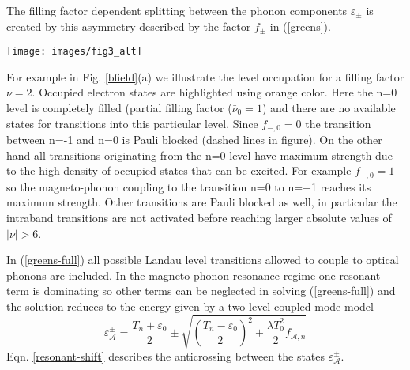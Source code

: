 \documentclass[prl,aps,superscriptaddress,showpacs,reprint]{revtex4-1}
\begin{document}
The filling factor dependent splitting between the phonon components $\varepsilon_{\pm}$ is created by this asymmetry described by the factor $f_{\pm}$ in (\ref{greens}).
\begin{figure*}
   \texttt{[image: images/fig3\_alt]}
   \caption{\label{bfield} a)Schematic view of the Landau level spectrum at B=12.6T, filling factor $\nu=2$ and the lowest Landau level transitions participating in magneto-phonon coupling. Filled electronic states are highlighted using orange color. Red and blue arrows show transitions allowed by the selection rule $\Delta\left|n\right|= \pm 1$. Dashed arrows mark Pauli blocked transitions. Circular arrows represent the angular momentum involved in the transitions b) Relative strength and filling factor dependence of individual terms of the phonon self energy. Terms describing interband transitions are shaded red, intraband transitions are shaded green  c) Position of the graphene G-band during a gatesweep at $B=12.6T$. The energy of the G-Band was extracted from two-peak Lorentz fits to Raman spectra. Vertical orange lines mark specific filling factors at $\nu=-6,-2,0,2,6$ where the n=-1,0,1 levels are completely filled/depleted with charge carriers ($\nu=0$ - half filling of n=0 level). The calculated magneto-phonon energies according to equation \ref{greens} are plotted as solid red($\Delta n = +1$) and solid blue($\Delta n = -1$) lines. Dashed lines include $\Delta n = 0$ transitions.}
\end{figure*}
For example in Fig. \ref{bfield}(a) we illustrate the level occupation for a filling factor $\nu=2$. Occupied electron states are highlighted using orange color. Here the n=0 level is completely filled (partial filling factor ($\bar{\nu}_0=1$) and there are no available states for transitions into this particular level. Since $f_{-,0}=0$ the transition between n=-1 and n=0 is Pauli blocked (dashed lines in figure). On the other hand all transitions originating from the n=0 level have maximum strength due to the high density of occupied states that can be excited. For example $f_{+,0}=1$ so the magneto-phonon coupling to the transition n=0 to n=+1 reaches its maximum strength. Other transitions are Pauli blocked as well, in particular the intraband transitions are not activated before reaching larger absolute values of $\left|\nu\right|>6$.

In (\ref{greens-full}) all possible Landau level transitions allowed to couple to optical phonons are included. In the magneto-phonon resonance regime one resonant term is dominating so other terms can be neglected in solving (\ref{greens-full}) and the solution reduces to the energy given by a two level coupled mode model \cite{yan2010observation,PhysRevLett.110.227402}
\begin{equation}
\label{resonant-shift}
\varepsilon_{\mathcal{A}}^{\pm}=\frac{T_n+\varepsilon_0}{2}\pm\sqrt{\left(\frac{T_n-\varepsilon_0}{2}\right)^2+\frac{\lambda T_0^2}{2}f_{\mathcal{A},n}}
\end{equation}
Eqn. \ref{resonant-shift} describes the anticrossing between the states $\varepsilon_{\mathcal{A}}^{\pm}$.
\end{document}
